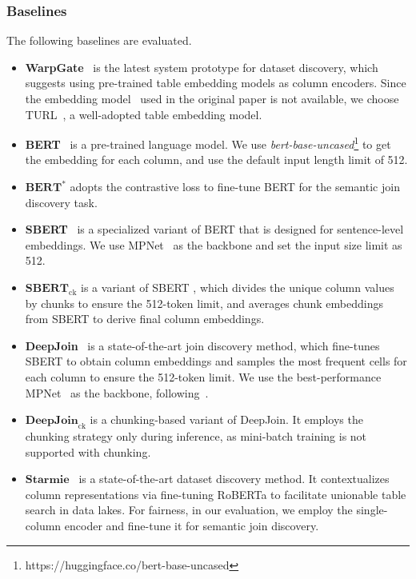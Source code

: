\subsubsection{Baselines} The following baselines are evaluated. 
\begin{itemize} 

\item{} \textbf{WarpGate}~\cite{WarpGate} is the latest system prototype for dataset discovery, which suggests using pre-trained table embedding models as column encoders. Since the embedding model~\cite{0002TGL21} used in the original paper is not available, we choose TURL~\cite{turl}, a well-adopted table embedding model.
\item{} \textbf{BERT}~\cite{bert} is a pre-trained language model. We use \textit{bert-base-uncased}\footnote{https://huggingface.co/bert-base-uncased} to get the embedding for each column, and use the default input length limit of 512.
\item{} $\textbf{BERT}^*$  adopts the contrastive loss to fine-tune BERT for the semantic join discovery task.
\item{} \textbf{SBERT}~\cite{sentencebert} is a specialized variant of BERT that is designed for sentence-level embeddings. We use MPNet~\cite{mpnet} as the backbone and set the input size limit as 512.
\item{}  $\textbf{SBERT}_\text{ck}$ is a variant of  SBERT , which divides the unique column values by chunks to ensure the 512-token limit, and averages chunk embeddings from SBERT to derive final column embeddings. 
\item{} \textbf{DeepJoin}~\cite{Deepjoin} is a state-of-the-art join discovery method, which fine-tunes SBERT to obtain column embeddings and samples the most frequent cells for each column to ensure the 512-token limit. We use the best-performance MPNet~\cite{mpnet} as the backbone, following~\cite{Deepjoin}.
\item{} $\textbf{DeepJoin}_\text{ck}$ is a chunking-based variant of DeepJoin. It employs the chunking strategy only during inference, as mini-batch training is not supported with chunking. 


\item{} $\textbf{Starmie}$~\cite{starmine} is a state-of-the-art dataset discovery method. It contextualizes column representations via fine-tuning RoBERTa to facilitate
unionable table search in data lakes. For fairness, in our evaluation, we employ the single-column encoder and fine-tune it for semantic join discovery.  


\end{itemize}
